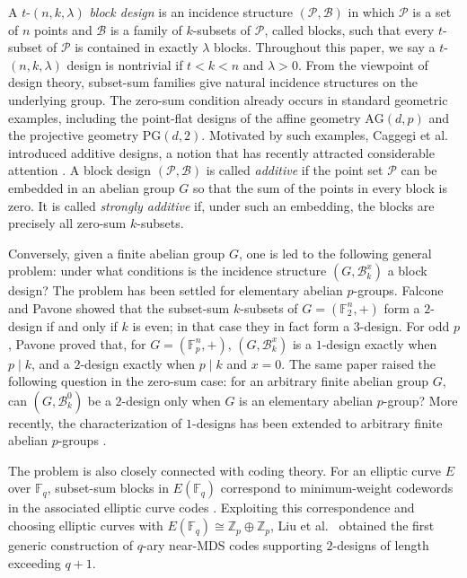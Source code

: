 \documentclass[11pt]{article}
\theoremstyle{definition}
\newcommand{\cB}{\mathcal B}
\begin{document}
 

A $t$-$(n,k,\lambda)$ \emph{block design} is an incidence structure $(\mathcal P,\mathcal B)$ in which $\mathcal P$ is a set of $n$ points and $\mathcal B$ is a family of $k$-subsets of $\mathcal P$, called blocks, such that every $t$-subset of $\mathcal P$ is contained in exactly $\lambda$ blocks. Throughout this paper, we say a $t$-$(n,k,\lambda)$ design is nontrivial if $t<k<n$ and $\lambda>0$.  From the viewpoint of design theory, subset-sum families give natural incidence structures on the underlying group. The zero-sum condition already occurs in standard geometric examples, including the point-flat designs of the affine geometry \(\mathrm{AG}(d,p)\) and the projective geometry \(\mathrm{PG}(d,2)\). Motivated by such examples, Caggegi et al.~\cite{CaggegiFalconePavone2017} introduced additive designs, a notion that has recently attracted considerable attention \cite{BurattiGaliciMontinaroNakicWassermann2026,BurattiMerolaNakic2025}. A block design \((\mathcal P,\mathcal B)\) is called \emph{additive} if the point set \(\mathcal P\) can be embedded in an abelian group \(G\) so that the sum of the points in every block is zero. It is called \emph{strongly additive} if, under such an embedding, the blocks are precisely all zero-sum \(k\)-subsets.
 
Conversely, given a finite abelian group \(G\), one is led to the following general problem: under what conditions is the incidence structure \((G,\cB_k^x)\) a block design?
The problem has been settled for elementary abelian $p$-groups. Falcone and Pavone \cite{FalconePavone2021} showed that the subset-sum $k$-subsets of $G=(\mathbb F_2^n,+)$ form a $2$-design if and only if $k$ is even; in that case they in fact form a $3$-design. For odd $p$, Pavone \cite{Pavone2023} proved that, for $G=(\mathbb F_p^n,+)$, \((G,\cB_k^x)\) is a $1$-design exactly when $p\mid k$, and a $2$-design exactly when $p\mid k$ and $x=0$. The same paper raised the following question in the zero-sum case: for an arbitrary finite abelian group $G$, can $(G,\cB_k^0)$ be a $2$-design only when $G$ is an elementary abelian $p$-group? More recently, the characterization of $1$-designs has been extended to arbitrary finite abelian $p$-groups \cite{LiuTangFanLuo2025}.
 
The problem is also closely connected with coding theory. For an elliptic curve $E$ over $\mathbb F_q$, subset-sum blocks in $E(\mathbb F_q)$ correspond to minimum-weight codewords in the associated elliptic curve codes \cite{Cheng2008,LiWanZhang2015,HanRen2024}. Exploiting this correspondence and choosing elliptic curves with $E(\mathbb F_q)\cong \mathbb Z_p\oplus\mathbb Z_p$, Liu et al.~\cite{LiuTangZhouHanChen2026} obtained the first generic construction of $q$-ary near-MDS codes supporting $2$-designs of length exceeding $q+1$.
  
\end{document}
